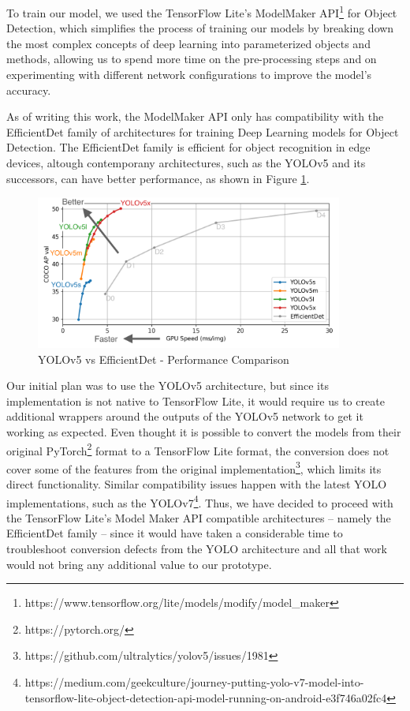 \documentclass[openright]{normas-utf-tex} %
\begin{document}
To train our model, we used the TensorFlow Lite's ModelMaker API\footnote{https://www.tensorflow.org/lite/models/modify/model\_maker} 
for Object Detection, which simplifies the process of training our models by breaking down the most
complex concepts of deep learning into parameterized objects and methods, allowing us to spend
more time on the pre-processing steps and on experimenting with different network configurations
to improve the model's accuracy. 

As of writing this work, the ModelMaker API only has compatibility
with the EfficientDet family of architectures \cite{Mingxing2020} for training
Deep Learning models for Object Detection. The EfficientDet family is efficient
for object recognition in edge devices, altough contemporany architectures,
such as the YOLOv5 and its successors, can have better performance, as shown in Figure \ref{fig:yoloefficientdet}.

\begin{figure}[H]
	\centering
	\includegraphics[width=0.9\textwidth]{./images/yolo-efficientdet-comparison.png}
	\caption[YOLOv5 vs EfficientDet - Performance Comparison]{YOLOv5 vs EfficientDet - Performance Comparison}
    \label{fig:yoloefficientdet}
\end{figure}

Our initial plan was to use the YOLOv5 architecture, but since its
implementation is not native to TensorFlow Lite, it would require us to create
additional wrappers around the outputs of the YOLOv5 network to get it working
as expected. Even thought it is possible to convert the models from their
original PyTorch\footnote{https://pytorch.org/} format to a TensorFlow Lite
format, the conversion does not cover some of the features from the original
implementation\footnote{https://github.com/ultralytics/yolov5/issues/1981},
which limits its direct functionality. Similar compatibility issues happen with
the latest YOLO implementations, such as the
YOLOv7\footnote{https://medium.com/geekculture/journey-putting-yolo-v7-model-into-tensorflow-lite-object-detection-api-model-running-on-android-e3f746a02fc4}.
Thus, we have decided to proceed with the TensorFlow Lite's Model Maker API
compatible architectures -- namely the EfficientDet family --  since it would
have taken a considerable time to troubleshoot conversion defects from the YOLO
architecture and all that work would not bring any additional value to our
prototype.
\end{document}
